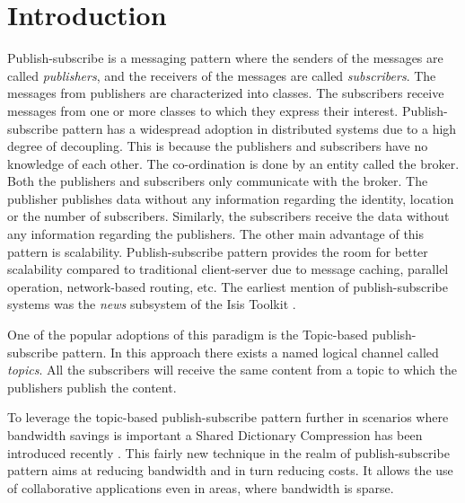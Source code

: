 \chapter{Introduction}\label{chapter:introduction}

Publish-subscribe is a messaging pattern where the senders of the messages are called \textit{publishers}, and the receivers of the messages are called \textit{subscribers}. The messages from publishers are characterized into classes. The subscribers receive messages from one or more classes to which they express their interest. Publish-subscribe pattern has a widespread adoption in distributed systems due to a high degree of decoupling. This is because the publishers and subscribers have no knowledge of each other. The co-ordination is done by an entity called the broker. Both the publishers and subscribers only communicate with the broker. The publisher publishes data without any information regarding the identity, location or the number of subscribers. Similarly, the subscribers receive the data without any information regarding the publishers. The other main advantage of this pattern is scalability. Publish-subscribe pattern provides the room for better scalability compared to traditional client-server due to message caching, parallel operation, network-based routing, etc. The earliest mention of publish-subscribe systems was the \textit{news} subsystem of the Isis Toolkit \parencite{Birman:1987:EVS:37499.37515}.

One of the popular adoptions of this paradigm is the Topic-based publish-subscribe pattern. In this approach there exists a named logical channel called \textit{topics}. All the subscribers will receive the same content from a topic to which the publishers publish the content.

To leverage the topic-based publish-subscribe pattern further in scenarios where bandwidth savings is important a Shared Dictionary Compression has been introduced recently \parencite{Doblander:2016:SDC}. This fairly new technique in the realm of publish-subscribe pattern aims at reducing bandwidth and in turn reducing costs. It allows the use of collaborative applications even in areas, where bandwidth is sparse.